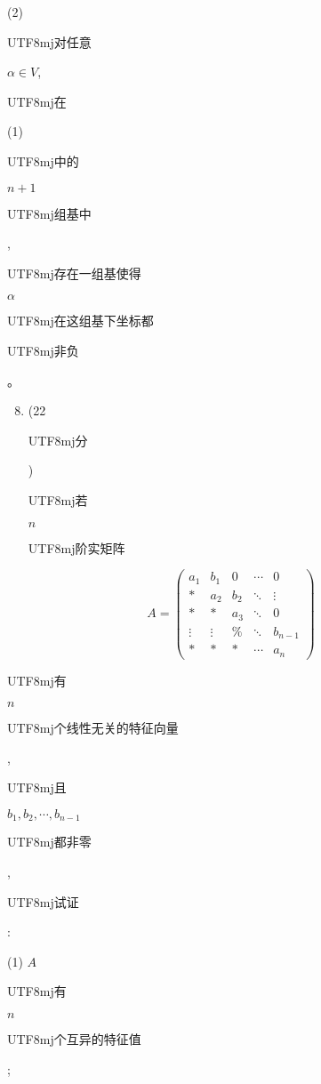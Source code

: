 \documentclass[10pt]{article}
\begin{document}
(2) \begin{CJK}{UTF8}{mj}对任意\end{CJK} $\alpha \in V$, \begin{CJK}{UTF8}{mj}在\end{CJK} (1) \begin{CJK}{UTF8}{mj}中的\end{CJK} $n+1$ \begin{CJK}{UTF8}{mj}组基中\end{CJK}, \begin{CJK}{UTF8}{mj}存在一组基使得\end{CJK} $\alpha$ \begin{CJK}{UTF8}{mj}在这组基下坐标都\end{CJK} \begin{CJK}{UTF8}{mj}非负\end{CJK}。

\begin{enumerate}
  \setcounter{enumi}{7}
  \item (22 \begin{CJK}{UTF8}{mj}分\end{CJK}) \begin{CJK}{UTF8}{mj}若\end{CJK} $n$ \begin{CJK}{UTF8}{mj}阶实矩阵\end{CJK}
\end{enumerate}
$$
A=\left(\begin{array}{ccccc}
a_{1} & b_{1} & 0 & \cdots & 0 \\
* & a_{2} & b_{2} & \ddots & \vdots \\
* & * & a_{3} & \ddots & 0 \\
\vdots & \vdots & \% & \ddots & b_{n-1} \\
* & * & * & \cdots & a_{n}
\end{array}\right)
$$
\begin{CJK}{UTF8}{mj}有\end{CJK} $n$ \begin{CJK}{UTF8}{mj}个线性无关的特征向量\end{CJK}, \begin{CJK}{UTF8}{mj}且\end{CJK} $b_{1}, b_{2}, \cdots, b_{n-1}$ \begin{CJK}{UTF8}{mj}都非零\end{CJK}, \begin{CJK}{UTF8}{mj}试证\end{CJK}:

(1) $A$ \begin{CJK}{UTF8}{mj}有\end{CJK} $n$ \begin{CJK}{UTF8}{mj}个互异的特征值\end{CJK};
\end{document}
